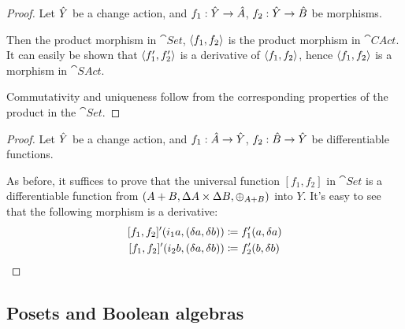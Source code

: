\products*
\begin{proof}
  \label{prf:products}
  Let $\hat{Y}$ be a change action, and $f_1: \hat{Y} \rightarrow \hat{A}$, $f_2: \hat{Y}
  \rightarrow \hat{B}$ be morphisms.

  Then the product morphism in $\cat{Set}$, $\left\langle {f_1}, {f_2} \right\rangle$ is the product
  morphism in $\cat{CAct}$. It can easily be
  shown that $\left\langle {f_1'}, {f_2'} \right\rangle$ is a derivative of $\left\langle {f_1}, {f_2} \right\rangle$,
  hence $\left\langle {f_1}, {f_2} \right\rangle$ is a morphism in $\cat{SAct}$.

  Commutativity and uniqueness follow from the corresponding properties of the
  product in the $\cat{Set}$.
\end{proof}

\disjointUnions*
\begin{proof}
  \label{prf:disjointUnions}
  Let $\hat{Y}$ be a change action, and $f_1 : \hat{A} \rightarrow \hat{Y}$, $f_2 : \hat{B}
  \rightarrow \hat{Y}$ be differentiable functions.

  As before, it suffices to prove that the universal function $[f_1, f_2]$ in $\cat{Set}$ is a differentiable
  function from $(A + B,\Delta A \times \Delta B,\oplus_{A + B})$ into $Y$. It's easy to see
  that the following morphism is a derivative:
  \begin{align*}
    \derive{[f_1, f_2]} (i_1 a, (\change{a}, \change{b})) &\defeq f_1'(a, \change{a})\\
    \derive{[f_1, f_2]} (i_2 b, (\change{a}, \change{b})) &\defeq f_2'(b, \change{b})
  \end{align*}
\end{proof}

\subsection{Posets and Boolean algebras}

